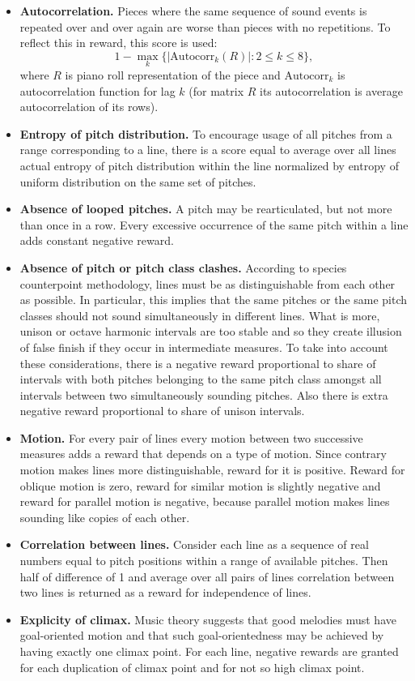 \documentclass{article}
\begin{document}
\begin{itemize}
	\item \textbf{Autocorrelation.} Pieces where the same sequence of sound events is repeated over and over again are worse than pieces with no repetitions. To reflect this in reward, this score is used:
	$$1 - \max_k \{|\mathrm{Autocorr}_k(R)| : 2 \le k \le 8\},$$
	where $R$ is piano roll representation of the piece and $\mathrm{Autocorr}_k$ is autocorrelation function for lag $k$ (for matrix $R$ its autocorrelation is average autocorrelation of its rows).
	\item \textbf{Entropy of pitch distribution.} To encourage usage of all pitches from a range corresponding to a line, there is a score equal to average over all lines actual entropy of pitch distribution within the line normalized by entropy of uniform distribution on the same set of pitches.
	\item \textbf{Absence of looped pitches.} A pitch may be rearticulated, but not more than once in a row. Every excessive occurrence of the same pitch within a line adds constant negative reward.
	\item \textbf{Absence of pitch or pitch class clashes.} According to species counterpoint methodology, lines must be as distinguishable from each other as possible. In particular, this implies that the same pitches or the same pitch classes should not sound simultaneously in different lines. What is more, unison or octave harmonic intervals are too stable and so they create illusion of false finish if they occur in intermediate measures. To take into account these considerations, there is a negative reward proportional to share of intervals with both pitches belonging to the same pitch class amongst all intervals between two simultaneously sounding pitches. Also there is extra negative reward proportional to share of unison intervals.
	\item \textbf{Motion.} For every pair of lines every motion between two successive measures adds a reward that depends on a type of motion. Since contrary motion makes lines more distinguishable, reward for it is positive. Reward for oblique motion is zero, reward for similar motion is slightly negative and reward for parallel motion is negative, because parallel motion makes lines sounding like copies of each other.
	\item \textbf{Correlation between lines.} Consider each line as a sequence of real numbers equal to pitch positions within a range of available pitches. Then half of difference of 1 and average over all pairs of lines correlation between two lines is returned as a reward for independence of lines. 
    \item \textbf{Explicity of climax.} Music theory suggests that good melodies must have goal-oriented motion and that such goal-orientedness may be achieved by having exactly one climax point. For each line, negative rewards are granted for each duplication of climax point and for not so high climax point. 
\end{itemize}
\end{document}
